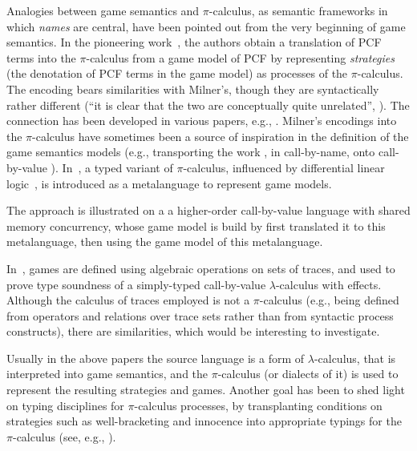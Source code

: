 \documentclass[11pt,a4paper]{amsart}
\theoremstyle{plain}
\theoremstyle{definition}
\theoremstyle{defC}
\theoremstyle{thmC}
\theoremstyle{plain}
\numberwithin{equation}{section}
\newif\iflong\longtrue
\newcommand{\dsOLD}[1]{} %
\newcommand{\dsOLD}[1]{}
\newcommand{\callcc}{\mathrm{call/cc}}
\theoremstyle{plain}
\theoremstyle{definition}
\begin{document}
\dsOLD{maybe this section could be merged with the conclusion ``Related  and future work'';
  also we could try to have a stronger structure (maybe subsections, not sure)}

Analogies between game semantics and $\pi$-calculus, as semantic frameworks in which
\emph{names} are central, have been pointed out from the very beginning of game
semantics. 
In the pioneering work~\cite{10.1145/224164.224189}, the authors 
obtain 
 a translation of PCF terms into the $\pi$-calculus from 
a game model of PCF by representing 
 \emph{strategies} 
(the denotation of PCF terms in the game model) as processes of the $\pi$-calculus.
The encoding bears similarities with Milner's, though they are syntactically rather
different (``it is clear that the two are conceptually quite unrelated'',
\cite{10.1145/224164.224189}).   The connection has been  developed in various papers,
e.g.,
\cite{DBLP:journals/entcs/Honda02,10.1016/S0304-3975-99-00039-0,10.5555/788020.788890,yoshida2020game,10.1145/3290340}.
Milner's encodings into the $\pi$-calculus have sometimes  been a source of inspiration  in
the definition of the game semantics models (e.g.,  transporting 
 the work 
\cite{10.1145/224164.224189}, in call-by-name, onto call-by-value
 \cite{10.1016/S0304-3975-99-00039-0}).  
In~\cite{yoshida2020game}, a  typed variant of  $\pi$-calculus, influenced by 
differential linear logic~\cite{ehrhard2018introduction},
is introduced as a metalanguage to represent game models.
\iflong 
 The approach is illustrated on a
a higher-order call-by-value language with shared memory concurrency, whose game model is build by first translated it
to this metalanguage, then using the game model of this metalanguage.
\fi
In~\cite{10.1109/LICS.2015.20}, games are defined using algebraic operations on sets of
traces, and used to  prove type soundness of a simply-typed call-by-value
$\lambda$-calculus with effects.
 Although the calculus of traces employed is not a $\pi$-calculus 
(e.g., being defined from operators and relations over trace sets rather than from
syntactic process constructs), there are similarities, which would be interesting to
investigate. 



Usually in the above  papers
the source language is a form of $\lambda$-calculus, 
that is interpreted into game semantics,  
and the 
 $\pi$-calculus  (or dialects of it)  is used to
represent the resulting strategies and games. 
Another goal has been to shed light on typing
disciplines  for 
$\pi$-calculus processes, by transplanting conditions on strategies such as well-bracketing
and innocence into appropriate typings for the $\pi$-calculus (see, e.g., 
\cite{berger2001sequentiality,YBH11,HirschkoffPS21}). 
\end{document}

